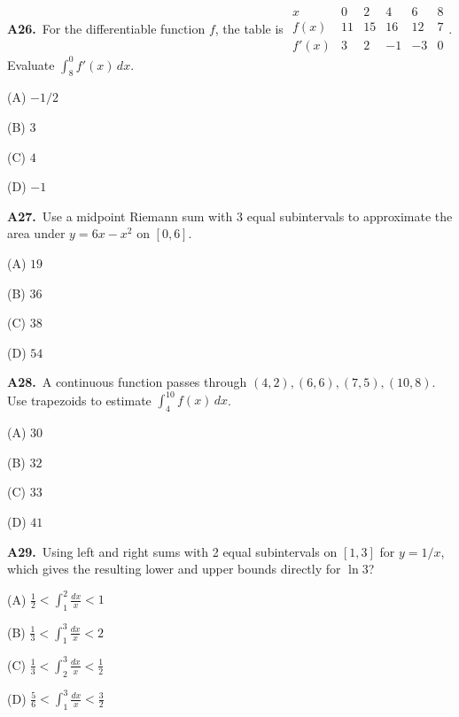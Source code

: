 \documentclass[11pt]{article}
\begin{document}
\bigskip\noindent\textbf{A26.}\ For the differentiable function $f$, the table is $\begin{array}{crrrrr}x&0&2&4&6&8\\\hline f(x)&11&15&16&12&7\\f'(x)&3&2&-1&-3&0\end{array}$. Evaluate $\int_8^0 f'(x)\,dx$.
\begin{list}{}{\setlength{\leftmargin}{3em}\setlength{\labelwidth}{2.5em}\setlength{\itemsep}{0pt}\setlength{\topsep}{2pt}}
\item[(A)] $-1/2$
\item[(B)] $3$
\item[(C)] $4$
\item[(D)] $-1$
\end{list}

\bigskip\noindent\textbf{A27.}\ Use a midpoint Riemann sum with 3 equal subintervals to approximate the area under $y=6x-x^2$ on $[0,6]$.
\begin{list}{}{\setlength{\leftmargin}{3em}\setlength{\labelwidth}{2.5em}\setlength{\itemsep}{0pt}\setlength{\topsep}{2pt}}
\item[(A)] $19$
\item[(B)] $36$
\item[(C)] $38$
\item[(D)] $54$
\end{list}

\bigskip\noindent\textbf{A28.}\ A continuous function passes through $(4,2),(6,6),(7,5),(10,8)$. Use trapezoids to estimate $\int_4^{10}f(x)\,dx$.
\begin{list}{}{\setlength{\leftmargin}{3em}\setlength{\labelwidth}{2.5em}\setlength{\itemsep}{0pt}\setlength{\topsep}{2pt}}
\item[(A)] $30$
\item[(B)] $32$
\item[(C)] $33$
\item[(D)] $41$
\end{list}

\bigskip\noindent\textbf{A29.}\ Using left and right sums with 2 equal subintervals on $[1,3]$ for $y=1/x$, which gives the resulting lower and upper bounds directly for $\ln3$?
\begin{list}{}{\setlength{\leftmargin}{3em}\setlength{\labelwidth}{2.5em}\setlength{\itemsep}{0pt}\setlength{\topsep}{2pt}}
\item[(A)] $\frac12<\int_1^2\frac{dx}x<1$
\item[(B)] $\frac13<\int_1^3\frac{dx}x<2$
\item[(C)] $\frac13<\int_2^3\frac{dx}x<\frac12$
\item[(D)] $\frac56<\int_1^3\frac{dx}x<\frac32$
\end{list}
\end{document}
